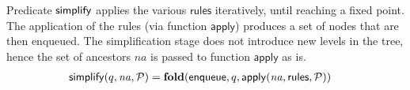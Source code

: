 Predicate $\mathsf{simplify}$ applies the various $\mathsf{rules}$ 
iteratively, until reaching a fixed point.
%
The application of the rules (via function
$\mathsf{apply}$) produces a set of nodes that
are then enqueued.
%
The simplification stage does not introduce new levels in the tree,
hence the set of ancestors $\mathit{na}$ is passed to function
$\mathsf{apply}$ as is.
%
\begin{align*}
  &\mathsf{simplify}(q, \mathit{na}, \mathcal P) = \mathbf{fold}(\mathsf{enqueue}, q,
    \mathsf{apply} (\mathit{na},
    \mathsf{rules}, \mathcal P))
\end{align*}


        


